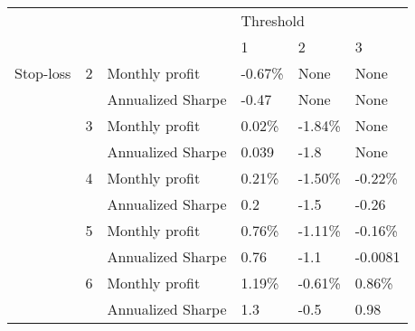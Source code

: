 \begin{tabular}{llllll}
\toprule
          &   &                   & \multicolumn{3}{l}{Threshold} \\
          &   &                   &         1 &        2 &        3 \\
\midrule
Stop-loss & 2 & Monthly profit &   -0.67\% &     None &     None \\
          &   & Annualized Sharpe &     -0.47 &     None &     None \\
          & 3 & Monthly profit &    0.02\% &  -1.84\% &     None \\
          &   & Annualized Sharpe &     0.039 &     -1.8 &     None \\
          & 4 & Monthly profit &    0.21\% &  -1.50\% &  -0.22\% \\
          &   & Annualized Sharpe &       0.2 &     -1.5 &    -0.26 \\
          & 5 & Monthly profit &    0.76\% &  -1.11\% &  -0.16\% \\
          &   & Annualized Sharpe &      0.76 &     -1.1 &  -0.0081 \\
          & 6 & Monthly profit &    1.19\% &  -0.61\% &   0.86\% \\
          &   & Annualized Sharpe &       1.3 &     -0.5 &     0.98 \\
\bottomrule
\end{tabular}
